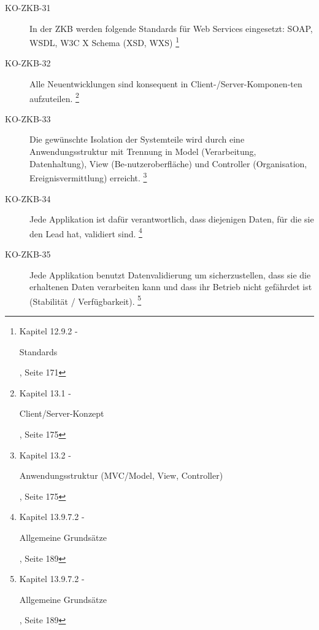 \documentclass[
11pt, %
a4paper, %
BCOR25mm, %
DIV14, %
footsepline = false, %
headsepline, %
twoside, %
openright,
abstracton, %
listof=totocnumbered, %
bibliography=totocnumbered %
]{scrreprt}
\begin{document}
\begin{description}
    \item[KO-ZKB-31] In der ZKB werden folgende Standards für Web Services
    eingesetzt: SOAP, WSDL, W3C X Schema (XSD, WXS)
    \footnote{\cite{ZkbHandbuchDerItArchitektur} Kapitel 12.9.2 -
    \begin{itshape}Standards\end{itshape}, Seite 171}
    
    \item[KO-ZKB-32] Alle Neuentwicklungen sind konsequent in
    Client-/Server-Komponen-ten aufzuteilen.
    \footnote{\cite{ZkbHandbuchDerItArchitektur} Kapitel 13.1 -
    \begin{itshape}Client/Server-Konzept\end{itshape}, Seite 175}
    
    \item[KO-ZKB-33] Die gewünschte Isolation der Systemteile wird durch
    eine Anwendungsstruktur mit Trennung in Model (Verarbeitung,
    Datenhaltung), View (Be-nutzeroberfläche) und Controller (Organisation,
    Ereignisvermittlung) erreicht.
    \footnote{\cite{ZkbHandbuchDerItArchitektur} Kapitel 13.2 -
    \begin{itshape}Anwendungsstruktur (MVC/Model, View,
    Controller)\end{itshape}, Seite 175}
    
    \item[KO-ZKB-34] Jede Applikation ist dafür verantwortlich, dass diejenigen
    Daten, für die sie den Lead hat, validiert sind.
    \footnote{\cite{ZkbHandbuchDerItArchitektur} Kapitel 13.9.7.2 -
    \begin{itshape}Allgemeine Grundsätze\end{itshape}, Seite 189}
    
    \item[KO-ZKB-35] Jede Applikation benutzt Datenvalidierung um
    sicherzustellen, dass sie die erhaltenen Daten verarbeiten kann und dass ihr Betrieb nicht
    gefährdet ist (Stabilität / Verfügbarkeit).
    \footnote{\cite{ZkbHandbuchDerItArchitektur} Kapitel 13.9.7.2 -
    \begin{itshape}Allgemeine Grundsätze\end{itshape}, Seite 189}
    

\end{description}
\end{document}
